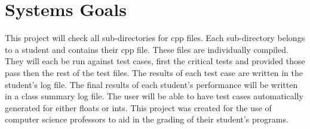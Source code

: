 \section{Systems Goals}
This project will check all sub-directories for cpp files. Each sub-directory
belongs to a student and contains their cpp file. These files are individually
compiled. They will each be run against test cases, first the critical tests and
provided those pass then the rest of the test files. The results of each test case
are written in the student's log file. The final results of each student's
performance will be written in a class summary log file. The user will be able
to have test cases automatically generated for either floats or ints. This project
was created for the use of computer science professors to aid in the grading of
their student's programs.


